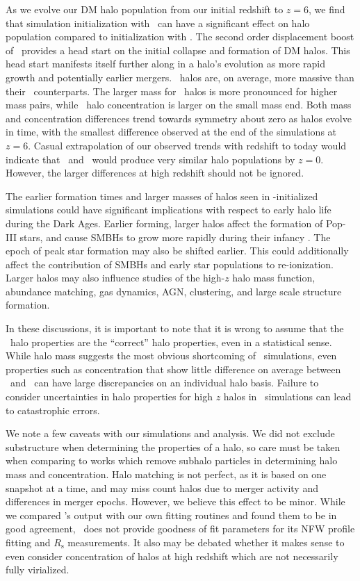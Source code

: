 As we evolve our DM halo population from our initial redshift to $z = 6$, we find that simulation initialization with \lpt\ can have a significant effect on halo population compared to initialization with \za.  The second order displacement boost of \lpt\ provides a head start on the initial collapse and formation of DM halos.  This head start manifests itself further along in a halo's evolution as more rapid growth and potentially earlier mergers.  \lpt\ halos are, on average, more massive than their \za\ counterparts.  The larger mass for \lpt\ halos is more pronounced for higher mass pairs, while \lpt\ halo concentration is larger on the small mass end.  Both mass and concentration differences trend towards symmetry about zero as halos evolve in time, with the smallest difference observed at the end of the simulations at $z = 6$.  Casual extrapolation of our observed trends with redshift to today would indicate that \lpt\ and \za\ would produce very similar halo populations by $z = 0$.  However, the larger differences at high redshift should not be ignored.

The earlier formation times and larger masses of halos seen in \lpt-initialized simulations could have significant implications with respect to early halo life during the Dark Ages.  Earlier forming, larger halos affect the formation of Pop-III stars, and cause SMBHs to grow more rapidly during their infancy \citep{2012ApJ...761L...8H}.  The epoch of peak star formation may also be shifted earlier.  This could additionally affect the contribution of SMBHs and early star populations to re-ionization.  Larger halos may also influence studies of the high-$z$ halo mass function, abundance matching, gas dynamics, AGN, clustering, and large scale structure formation.

In these discussions, it is important to note that it is wrong to assume that the \za\ halo properties are the ``correct'' halo properties, even in a statistical sense.  While halo mass suggests the most obvious shortcoming of \za\ simulations, even properties such as concentration that show little difference on average between \lpt\ and \za\ can have large discrepancies on an individual halo basis.  Failure to consider uncertainties in halo properties for high $z$ halos in \za\ simulations can lead to catastrophic errors.

We note a few caveats with our simulations and analysis.  We did not exclude substructure when determining the properties of a halo, so care must be taken when comparing to works which remove subhalo particles in determining halo mass and concentration.  Halo matching is not perfect, as it is based on one snapshot at a time, and may miss count halos due to merger activity and differences in merger epochs.  However, we believe this effect to be minor.  While we compared \rockstar's output with our own fitting routines and found them to be in good agreement, \rockstar\ does not provide goodness of fit parameters for its NFW profile fitting and $R_{\mathrm{s}}$ measurements.  It also may be debated whether it makes sense to even consider concentration of halos at high redshift which are not necessarily fully virialized.

